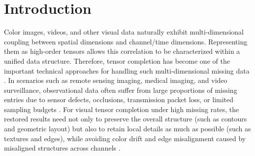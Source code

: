 \documentclass[a4paper,12pt]{article}
\numberwithin{equation}{section}
\numberwithin{algorithm}{section}
\theoremstyle{remark}
\theoremstyle{definition}
\begin{document}
\setcounter{equation}{0}
\section{Introduction}

Color images, videos, and other visual data naturally exhibit multi-dimensional coupling between spatial dimensions and channel/time dimensions. Representing them as high-order tensors allows this correlation to be characterized within a unified data structure. Therefore, tensor completion has become one of the important technical approaches for handling such multi-dimensional missing data \cite{liu2013tensor}. In scenarios such as remote sensing imaging, medical imaging, and video surveillance, observational data often suffer from large proportions of missing entries due to sensor defects, occlusions, transmission packet loss, or limited sampling budgets \cite{bengua2017tt, li2017tv}. For visual tensor completion under high missing rates, the restored results need not only to preserve the overall structure (such as contours and geometric layout) but also to retain local details as much as possible (such as textures and edges), while avoiding color drift and edge misalignment caused by misaligned structures across channels \cite{zhao2021complementary}.
\end{document}
